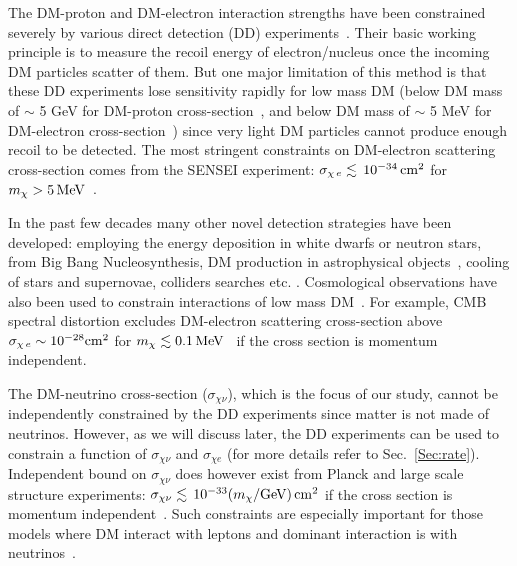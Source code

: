 \documentclass[11pt,prd,twocolumn,nofootinbib,reprint,superscriptaddress,longbibliography,colorlinks=true,citecolor=blue]{revtex4-1}
\begin{document}
The DM-proton and DM-electron interaction strengths have been constrained severely by various direct detection (DD)
experiments~\cite{XENON:2020iwh,XENON:2020rca,Crisler:2018gci,CRESST:2015txj,DarkSide:2018ppu}. Their basic working principle is to measure the recoil
energy of electron/nucleus once the incoming DM particles scatter of them. But one major limitation of this method is that these DD experiments lose
sensitivity rapidly for low mass DM (below DM mass of $\sim$ 5 GeV for DM-proton cross-section~\cite{XENON:2015gkh}, and below DM mass of $\sim$ 5 MeV for DM-electron cross-section~\cite{Essig:2012yx})
since very light DM particles cannot produce enough recoil to be detected.
The most stringent constraints on DM-electron scattering cross-section comes from the SENSEI experiment: $\sigma_{\chi\,e}\lesssim \, 10^{-34} \,\rm{cm^2}$ for $m_\chi > 5\,{\rm MeV}$~\cite{SENSEI:2019ibb}. 

In the past few decades many other novel detection strategies have been developed: employing the energy deposition in white dwarfs or neutron stars\cite{Baryakhtar:2017dbj,Dasgupta:2019juq,Bose:2021yhz,Guha:2021njn,Sen:2021wev,Acevedo:2020gro,Leane:2020wob,Garani:2020wge,Joglekar:2020liw,Joglekar:2019vzy},
from Big Bang Nucleosynthesis\cite{Green:2017ybv,Baumann:2016wac,Krnjaic:2019dzc}, DM production in astrophysical objects~\cite{McKeen:2020vpf}, cooling of stars and supernovae\cite{Raffelt:2006cw,Raffelt:1999tx,Kadota:2014mea,Dreiner:2013mua,Guha:2018mli}, colliders searches etc. \cite{Bai:2011wy,Cohen:2015toa}.
Cosmological observations have also been used to constrain interactions of low mass DM~\cite{Ali-Haimoud:2021lka,Nguyen:2021cnb}. For example, CMB spectral distortion excludes DM-electron
scattering cross-section above $\sigma_{\chi\,e}  \sim 10^{-28}{\rm cm^2}$ for $m_\chi \lesssim 0.1\,{\rm MeV}$~\cite{Ali-Haimoud:2021lka} if the cross section is momentum independent.

The DM-neutrino cross-section ($\sigma_{\chi\nu}$), which is the focus of our study, cannot be independently constrained by the DD experiments since matter is not made of neutrinos. 
However, as we will discuss later, the DD experiments can be used to constrain a function of $\sigma_{\chi\nu}$ and $\sigma_{\chi e}$ (for more details refer to Sec.~\ref{Sec:rate}). 
Independent bound on $\sigma_{\chi\nu}$ does however exist from Planck and large scale structure experiments: $\sigma_{\chi\nu}\lesssim \, 10^{-33} (m_\chi/{\rm GeV)\,cm^2}$
if the cross section is momentum independent~\cite{Wilkinson:2014ksa}. {Such constraints are especially important for those models where DM interact with leptons and dominant interaction is with neutrinos~\cite{Brune:2018sab,Blennow:2019fhy}.}
\end{document}
